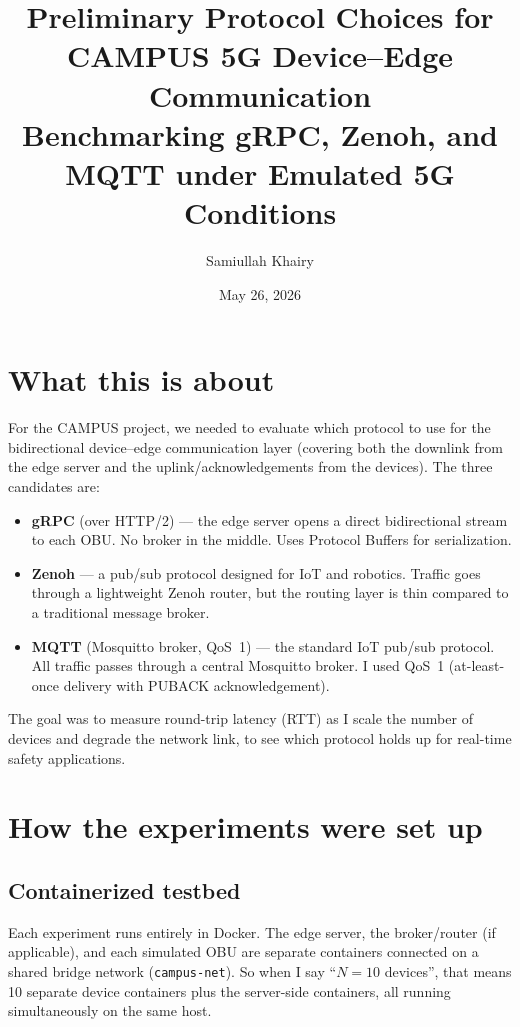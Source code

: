 \documentclass[11pt,a4paper]{article}
\title{Preliminary Protocol Choices for CAMPUS 5G Device--Edge Communication\\[0.3em]
\large Benchmarking gRPC, Zenoh, and MQTT under Emulated 5G Conditions}
\author{Samiullah Khairy}
\date{May 26, 2026}
\begin{document}
\maketitle

\section{What this is about}

For the CAMPUS project, we needed to evaluate which protocol to use for the bidirectional device--edge communication layer (covering both the downlink from the edge server and the uplink/acknowledgements from the devices). The three candidates are:

\begin{itemize}
    \item \textbf{gRPC} (over HTTP/2) --- the edge server opens a direct bidirectional stream to each OBU. No broker in the middle. Uses Protocol Buffers for serialization.
    \item \textbf{Zenoh} --- a pub/sub protocol designed for IoT and robotics. Traffic goes through a lightweight Zenoh router, but the routing layer is thin compared to a traditional message broker.
    \item \textbf{MQTT} (Mosquitto broker, QoS~1) --- the standard IoT pub/sub protocol. All traffic passes through a central Mosquitto broker. I used QoS~1 (at-least-once delivery with PUBACK acknowledgement).
\end{itemize}

The goal was to measure round-trip latency (RTT) as I scale the number of devices and degrade the network link, to see which protocol holds up for real-time safety applications.

\section{How the experiments were set up}

\subsection{Containerized testbed}

Each experiment runs entirely in Docker. The edge server, the broker/router (if applicable), and each simulated OBU are separate containers connected on a shared bridge network (\texttt{campus-net}). So when I say ``$N=10$ devices'', that means 10 separate device containers plus the server-side containers, all running simultaneously on the same host.
\end{document}
